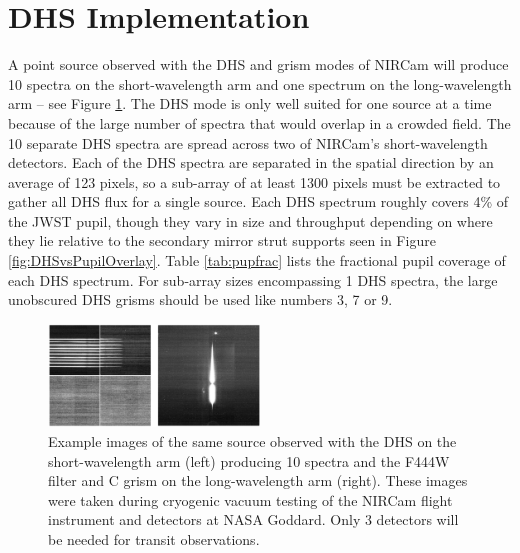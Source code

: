 \documentclass{emulateapj}
\begin{document}
\section{DHS Implementation}\label{sec:implementation}

A point source observed with the DHS and grism modes of NIRCam will produce 10 spectra on the short-wavelength arm and one spectrum on the long-wavelength arm -- see Figure \ref{fig:DHSimage}. The DHS mode is only well suited for one source at a time because of the large number of spectra that would overlap in a crowded field. The 10 separate DHS spectra are spread across two of NIRCam's short-wavelength detectors. Each of the DHS spectra are separated in the spatial direction by an average of 123 pixels, so a sub-array of at least 1300 pixels must be extracted to gather all DHS flux for a single source. Each DHS spectrum roughly covers 4\% of the JWST pupil, though they vary in size and throughput depending on where they lie relative to the secondary mirror strut supports seen in Figure \ref{fig:DHSvsPupilOverlay}. Table \ref{tab:pupfrac} lists the fractional pupil coverage of each DHS spectrum. For sub-array sizes encompassing 1 DHS spectra, the large unobscured DHS grisms should be used like numbers 3, 7 or 9.

\begin{figure}[!ht]
\includegraphics[width=0.5\textwidth]{dhs_image_example.png}
\caption{Example images of the same source observed with the DHS on the short-wavelength arm (left) producing 10 spectra and the F444W filter and C grism on the long-wavelength arm (right). These images were taken during cryogenic vacuum testing of the NIRCam flight instrument and detectors at NASA Goddard. Only 3 detectors will be needed for transit observations.}\label{fig:DHSimage}
\end{figure}
\end{document}
